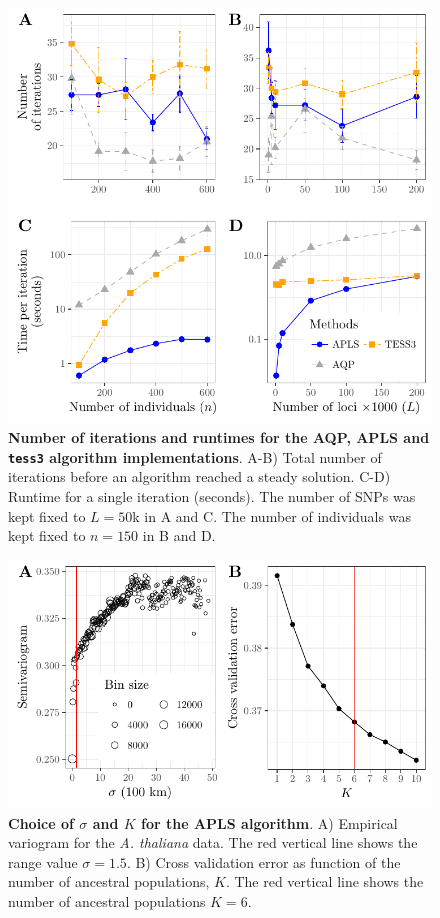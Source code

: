 \begin{figure}
  \centering
  \includegraphics[width=\textwidth]{./Figures/figure4.pdf}
  \caption{{\bf Number of iterations and runtimes for the AQP, APLS and {\tt
        tess3} algorithm implementations}. A-B) Total number of iterations
    before an algorithm reached a steady solution. C-D) Runtime for a single
    iteration (seconds). The number of SNPs was kept fixed to $L = 50$k in A and
    C. The number of individuals was kept fixed to $n = 150$ in B and D.}
  \label{fig:fig4}
\end{figure}

\clearpage 
\newpage

\begin{figure}
  \centering
\includegraphics[width=\textwidth]{./Figures/figure5.pdf}
\caption{{\bf Choice of $\sigma$ and $K$ for the APLS algorithm}. A) Empirical
  variogram for the {\it A. thaliana} data. The red vertical line shows the
  range value $\sigma = 1.5$. B) Cross validation error as function of the
  number of ancestral populations, $K$. The red vertical line shows the number
  of ancestral populations $K = 6$.}
  \label{fig:fig5}
\end{figure}


